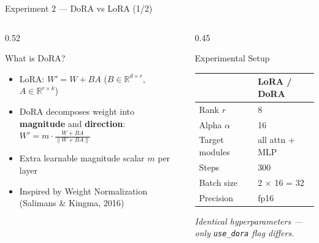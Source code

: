 \documentclass[aspectratio=169,10pt]{beamer}
\begin{document}
\begin{frame}{Experiment 2 — DoRA vs LoRA (1/2)}

  \begin{columns}[T]
    \begin{column}{0.52\textwidth}
      \begin{block}{What is DoRA?}
        \begin{itemize}\small
          \item LoRA: $W' = W + BA$ \quad ($B \in \mathbb{R}^{d \times r}$, $A \in \mathbb{R}^{r \times k}$)
          \item DoRA decomposes weight into \textbf{magnitude} and \textbf{direction}:
                $W' = m \cdot \frac{W + BA}{\|W + BA\|}$
          \item Extra learnable magnitude scalar $m$ per layer
          \item Inspired by Weight Normalization (Salimans \& Kingma, 2016)
        \end{itemize}
      \end{block}
    \end{column}

    \begin{column}{0.45\textwidth}
      \begin{block}{Experimental Setup}
        \small
        \begin{tabular}{ll}
          \toprule
          & LoRA \quad / \quad DoRA \\
          \midrule
          Rank $r$     & 8 \\
          Alpha $\alpha$ & 16 \\
          Target modules & all attn + MLP \\
          Steps        & 300 \\
          Batch size   & 2 $\times$ 16 = 32 \\
          Precision    & fp16 \\
          \bottomrule
        \end{tabular}

        \vspace{0.4em}
        \textit{Identical hyperparameters — only \texttt{use\_dora} flag differs.}
      \end{block}
    \end{column}
  \end{columns}
\end{frame}
\end{document}
